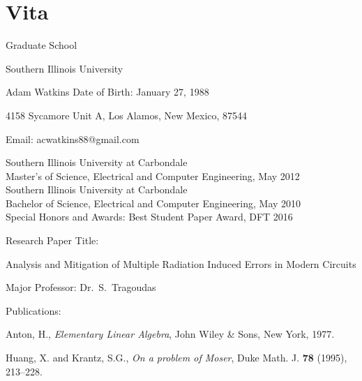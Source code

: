 

\chapter*{Vita}



\setlength{\baselineskip}{14pt}
\setlength{\parindent}{0pt}
\setlength{\parskip}{14pt}

\centerline{Graduate School}
\centerline{Southern Illinois University}

\bigskip
Adam Watkins \hfill Date of Birth: January 27, 1988\qquad 

4158 Sycamore Unit A, Los Alamos, New Mexico, 87544

\vskip8pt
Email: acwatkins88@gmail.com
\vskip8pt

Southern Illinois University at Carbondale\\
Master's of Science, Electrical and Computer Engineering, May 2012\\

Southern Illinois University at Carbondale\\
Bachelor of Science, Electrical and Computer Engineering, May 2010\\

\vspace{8pt}
Special Honors and Awards: Best Student Paper Award, DFT 2016

\vspace{8pt}
Research Paper Title: 

\vspace{-14pt}  %
{
Analysis and Mitigation of Multiple Radiation Induced Errors in Modern Circuits
\par}

\vspace{14pt}
Major Professor: Dr.\ S.\ Tragoudas

\vspace{14pt}
Publications: 
	
Anton, H.,
\emph{Elementary Linear Algebra},
John Wiley \& Sons, New York, 1977.
	
Huang, X. and Krantz, S.G.,
\emph{On a problem of Moser},
Duke Math. J.
{\bf 78} (1995), 213--228.

